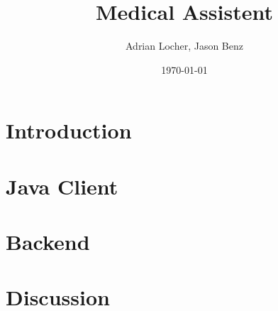 \documentclass[11pt, letterpaper]{report}
\title{Medical Assistent}
\author{Adrian Locher, Jason Benz}
\date{\today}
\begin{document}
\maketitle
\chapter{Introduction}
\chapter{Java Client}
\chapter{Backend}
\chapter{Discussion}
\end{document}
